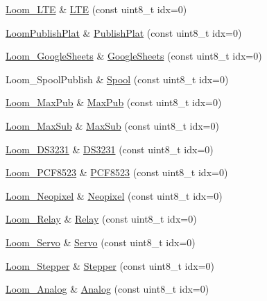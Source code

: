 \begin{DoxyCompactItemize}
\item 
\hyperlink{class_loom___l_t_e}{Loom\+\_\+\+L\+TE} \& \hyperlink{class_loom_manager_a0b5e54f112f357169523e993bc49a547}{L\+TE} (const uint8\+\_\+t idx=0)
\item 
\hyperlink{class_loom_publish_plat}{Loom\+Publish\+Plat} \& \hyperlink{class_loom_manager_a302fccc089e8d608548bc58abd8dccca}{Publish\+Plat} (const uint8\+\_\+t idx=0)
\item 
\hyperlink{class_loom___google_sheets}{Loom\+\_\+\+Google\+Sheets} \& \hyperlink{class_loom_manager_ad21d7fa120541af2e2f20c7e4b59d8c7}{Google\+Sheets} (const uint8\+\_\+t idx=0)
\item 
Loom\+\_\+\+Spool\+Publish \& \hyperlink{class_loom_manager_a4ca73cdf90feff2138e037a19e22f9de}{Spool} (const uint8\+\_\+t idx=0)
\item 
\hyperlink{class_loom___max_pub}{Loom\+\_\+\+Max\+Pub} \& \hyperlink{class_loom_manager_ab2fb9b98506e41d72a1f39b182d7b87b}{Max\+Pub} (const uint8\+\_\+t idx=0)
\item 
\hyperlink{class_loom___max_sub}{Loom\+\_\+\+Max\+Sub} \& \hyperlink{class_loom_manager_a2a50b8b451f4d9d28cbc702805b9f3dc}{Max\+Sub} (const uint8\+\_\+t idx=0)
\item 
\hyperlink{class_loom___d_s3231}{Loom\+\_\+\+D\+S3231} \& \hyperlink{class_loom_manager_aab5140dd99b464153284e0a7fb4f2aca}{D\+S3231} (const uint8\+\_\+t idx=0)
\item 
\hyperlink{class_loom___p_c_f8523}{Loom\+\_\+\+P\+C\+F8523} \& \hyperlink{class_loom_manager_a80eaaf9c4a44b04fb17059d7b739c30f}{P\+C\+F8523} (const uint8\+\_\+t idx=0)
\item 
\hyperlink{class_loom___neopixel}{Loom\+\_\+\+Neopixel} \& \hyperlink{class_loom_manager_a564de486f940e0ad9f3a75c97bbf29cf}{Neopixel} (const uint8\+\_\+t idx=0)
\item 
\hyperlink{class_loom___relay}{Loom\+\_\+\+Relay} \& \hyperlink{class_loom_manager_ad4e0fadb443db115e69cb59e191f812f}{Relay} (const uint8\+\_\+t idx=0)
\item 
\hyperlink{class_loom___servo}{Loom\+\_\+\+Servo} \& \hyperlink{class_loom_manager_a2af6939f38dc800ae338809e64e7941c}{Servo} (const uint8\+\_\+t idx=0)
\item 
\hyperlink{class_loom___stepper}{Loom\+\_\+\+Stepper} \& \hyperlink{class_loom_manager_a4e1f0a483f7b8e7c94b6e6c6c5e0720d}{Stepper} (const uint8\+\_\+t idx=0)
\item 
\hyperlink{class_loom___analog}{Loom\+\_\+\+Analog} \& \hyperlink{class_loom_manager_a9d12c1b6aaf4faabfcbf9550be3a7d5e}{Analog} (const uint8\+\_\+t idx=0)

\end{DoxyCompactItemize}
